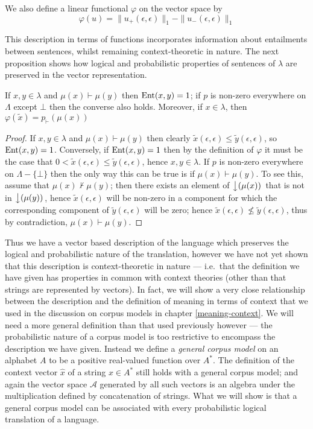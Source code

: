 We also define a linear functional $\varphi$ on the vector space by
$$\varphi(u) = \|u_+(\epsilon,\epsilon)\|_1 - \|u_-(\epsilon,\epsilon)\|_1$$

This description in terms of functions incorporates information about entailments between sentences, whilst remaining context-theoretic in nature. The next proposition shows how logical and probabilistic properties of sentences of $\lambda$ are preserved in the vector representation.
\begin{prop}
If $x,y \in \lambda$ and $\mu(x) \vdash \mu(y)$ then $\operatorname{Ent}(x,y) = 1$; if $p$ is non-zero everywhere on $\Lambda$ except $\bot$ then the converse also holds. Moreover, if $x\in \lambda$, then $\varphi(\tilde{x}) = p_\vdash(\mu(x))$
\end{prop}
\begin{proof}
If $x,y \in \lambda$ and $\mu(x) \vdash \mu(y)$ then clearly $\tilde{x}(\epsilon,\epsilon) \le \tilde{y}(\epsilon,\epsilon)$, so $\operatorname{Ent}(x,y) = 1$. Conversely, if $\operatorname{Ent}(x,y) = 1$ then by the definition of $\varphi$ it must be the case that $0 < \tilde{x}(\epsilon,\epsilon) \le \tilde{y}(\epsilon,\epsilon)$, hence $x,y \in \lambda$. If $p$ is non-zero everywhere on $\Lambda - \{\bot\}$ then the only way this can be true is if $\mu(x) \vdash \mu(y)$. To see this, assume that $\mu(x) \nvdash \mu(y)$; then there exists an element of $\left\downarrow(\mu(x))\right.$ that is not in $\left\downarrow(\mu(y))\right.$, hence $\tilde{x}(\epsilon,\epsilon)$ will be non-zero in a component for which the corresponding component of $\tilde{y}(\epsilon,\epsilon)$ will be zero; hence $\tilde{x}(\epsilon,\epsilon)\nleq \tilde{y}(\epsilon,\epsilon)$, thus by contradiction, $\mu(x) \vdash \mu(y)$.
\end{proof}

Thus we have a vector based description of the language which preserves the logical and probabilistic nature of the translation, however we have not yet shown that this description is context-theoretic in nature --- i.e.~that the definition we have given has properties in common with context theories (other than that strings are represented by vectors). In fact, we will show a very close relationship between the description and the definition of meaning in terms of context that we used in the discussion on corpus models in chapter \ref{meaning-context}. We will need a more general definition than that used previously however --- the probabilistic nature of a corpus model is too restrictive to encompass the description we have given. Instead we define a \emph{general corpus model} on an alphabet $A$ to be a positive real-valued function over $A^*$. The definition of the context vector $\hat{x}$ of a string $x\in A^*$ still holds with a general corpus model; and again the vector space $\mathcal{A}$ generated by all such vectors is an algebra under the multiplication defined by concatenation of strings. What we will show is that a general corpus model can be associated with every probabilistic logical translation of a language.

